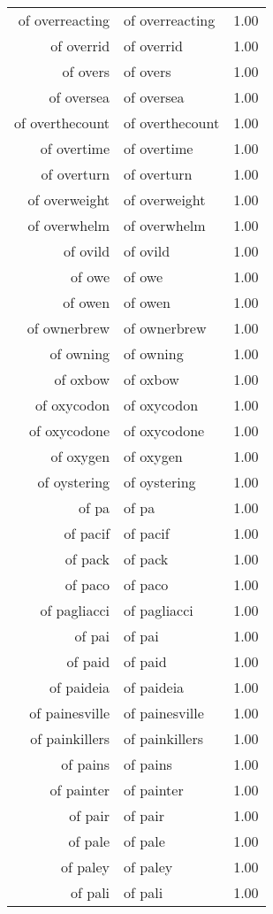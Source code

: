 \begin{table}[ht]
\begin{tabular}{rlr}
  of overreacting & of overreacting & 1.00 \\ 
  of overrid & of overrid & 1.00 \\ 
  of overs & of overs & 1.00 \\ 
  of oversea & of oversea & 1.00 \\ 
  of overthecount & of overthecount & 1.00 \\ 
  of overtime & of overtime & 1.00 \\ 
  of overturn & of overturn & 1.00 \\ 
  of overweight & of overweight & 1.00 \\ 
  of overwhelm & of overwhelm & 1.00 \\ 
  of ovild & of ovild & 1.00 \\ 
  of owe & of owe & 1.00 \\ 
  of owen & of owen & 1.00 \\ 
  of ownerbrew & of ownerbrew & 1.00 \\ 
  of owning & of owning & 1.00 \\ 
  of oxbow & of oxbow & 1.00 \\ 
  of oxycodon & of oxycodon & 1.00 \\ 
  of oxycodone & of oxycodone & 1.00 \\ 
  of oxygen & of oxygen & 1.00 \\ 
  of oystering & of oystering & 1.00 \\ 
  of pa & of pa & 1.00 \\ 
  of pacif & of pacif & 1.00 \\ 
  of pack & of pack & 1.00 \\ 
  of paco & of paco & 1.00 \\ 
  of pagliacci & of pagliacci & 1.00 \\ 
  of pai & of pai & 1.00 \\ 
  of paid & of paid & 1.00 \\ 
  of paideia & of paideia & 1.00 \\ 
  of painesville & of painesville & 1.00 \\ 
  of painkillers & of painkillers & 1.00 \\ 
  of pains & of pains & 1.00 \\ 
  of painter & of painter & 1.00 \\ 
  of pair & of pair & 1.00 \\ 
  of pale & of pale & 1.00 \\ 
  of paley & of paley & 1.00 \\ 
  of pali & of pali & 1.00 \\ 

\end{tabular}
\end{table}
